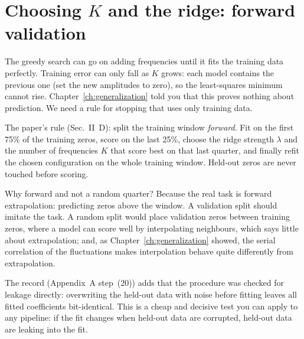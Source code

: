 \section{Choosing $K$ and the ridge: forward validation}\label{sec:sparse-frequency-validation}

The greedy search can go on adding frequencies until it fits the training data perfectly. Training error can only fall as $K$ grows: each model contains the previous one (set the new amplitudes to zero), so the least-squares minimum cannot rise. Chapter~\ref{ch:generalization} told you that this proves nothing about prediction. We need a rule for stopping that uses only training data.

The paper's rule (Sec.~II~D): split the training window \emph{forward}. Fit on the first 75\% of the training zeros, score on the last 25\%, choose the ridge strength $\lambda$ and the number of frequencies $K$ that score best on that last quarter, and finally refit the chosen configuration on the whole training window. Held-out zeros are never touched before scoring.

Why forward and not a random quarter? Because the real task is forward extrapolation: predicting zeros above the window. A validation split should imitate the task. A random split would place validation zeros between training zeros, where a model can score well by interpolating neighbours, which says little about extrapolation; and, as Chapter~\ref{ch:generalization} showed, the serial correlation of the fluctuations makes interpolation behave quite differently from extrapolation.

The record (Appendix~A step~(20)) adds that the procedure was checked for leakage directly: overwriting the held-out data with noise before fitting leaves all fitted coefficients bit-identical. This is a cheap and decisive test you can apply to any pipeline: if the fit changes when held-out data are corrupted, held-out data are leaking into the fit.

